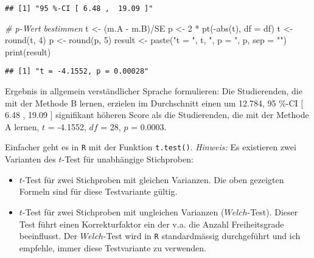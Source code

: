 \documentclass[
]{book}
\newenvironment{Shaded}{\begin{snugshade}}{\end{snugshade}}
\newcommand{\AttributeTok}[1]{\textcolor[rgb]{0.77,0.63,0.00}{#1}}
\newcommand{\CommentTok}[1]{\textcolor[rgb]{0.56,0.35,0.01}{\textit{#1}}}
\newcommand{\DecValTok}[1]{\textcolor[rgb]{0.00,0.00,0.81}{#1}}
\newcommand{\FunctionTok}[1]{\textcolor[rgb]{0.00,0.00,0.00}{#1}}
\newcommand{\NormalTok}[1]{#1}
\newcommand{\OtherTok}[1]{\textcolor[rgb]{0.56,0.35,0.01}{#1}}
\newcommand{\SpecialCharTok}[1]{\textcolor[rgb]{0.00,0.00,0.00}{#1}}
\newcommand{\StringTok}[1]{\textcolor[rgb]{0.31,0.60,0.02}{#1}}
\providecommand{\tightlist}{%
  \setlength{\itemsep}{0pt}\setlength{\parskip}{0pt}}
\begin{document}
\begin{verbatim}
## [1] "95 %-CI [ 6.48 ,  19.09 ]"
\end{verbatim}

\begin{Shaded}
\begin{Highlighting}[]
\CommentTok{\# p{-}Wert bestimmen}
\NormalTok{t }\OtherTok{\textless{}{-}}\NormalTok{ (m.A }\SpecialCharTok{{-}}\NormalTok{ m.B)}\SpecialCharTok{/}\NormalTok{SE}
\NormalTok{p }\OtherTok{\textless{}{-}} \DecValTok{2} \SpecialCharTok{*} \FunctionTok{pt}\NormalTok{(}\SpecialCharTok{{-}}\FunctionTok{abs}\NormalTok{(t), }\AttributeTok{df =}\NormalTok{ df)}
\NormalTok{t }\OtherTok{\textless{}{-}} \FunctionTok{round}\NormalTok{(t, }\DecValTok{4}\NormalTok{)}
\NormalTok{p }\OtherTok{\textless{}{-}} \FunctionTok{round}\NormalTok{(p, }\DecValTok{5}\NormalTok{)}
\NormalTok{result }\OtherTok{\textless{}{-}} \FunctionTok{paste}\NormalTok{(}\StringTok{"t = "}\NormalTok{, t, }\StringTok{", p = "}\NormalTok{, p, }\AttributeTok{sep =} \StringTok{""}\NormalTok{)  }
\FunctionTok{print}\NormalTok{(result)}
\end{Highlighting}
\end{Shaded}

\begin{verbatim}
## [1] "t = -4.1552, p = 0.00028"
\end{verbatim}

Ergebnis in allgemein verständlicher Sprache formulieren: Die Studierenden, die mit der Methode B lernen, erzielen im Durchschnitt einen um 12.784, 95 \%-CI {[} 6.48 , 19.09 {]} signifikant höheren Score als die Studierenden, die mit der Methode A lernen, \(t\) = -4.1552, \(df\) = 28, \(p\) = 0.0003.

Einfacher geht es in \texttt{R} mit der Funktion \texttt{t.test()}. \emph{Hinweis:} Es existieren zwei Varianten des \(t\)-Test für unabhängige Stichproben:

\begin{itemize}
\tightlist
\item
  \(t\)-Test für zwei Stichproben mit gleichen Varianzen. Die oben gezeigten Formeln sind für diese Testvariante gültig.\\
\item
  \(t\)-Test für zwei Stichproben mit ungleichen Varianzen (\(Welch\)-Test). Dieser Test führt einen Korrekturfaktor ein der v.a. die Anzahl Freiheitsgrade beeinflusst. Der \(Welch\)-Test wird in \texttt{R} standardmässig durchgeführt und ich empfehle, immer diese Testvariante zu verwenden.
\end{itemize}
\end{document}
